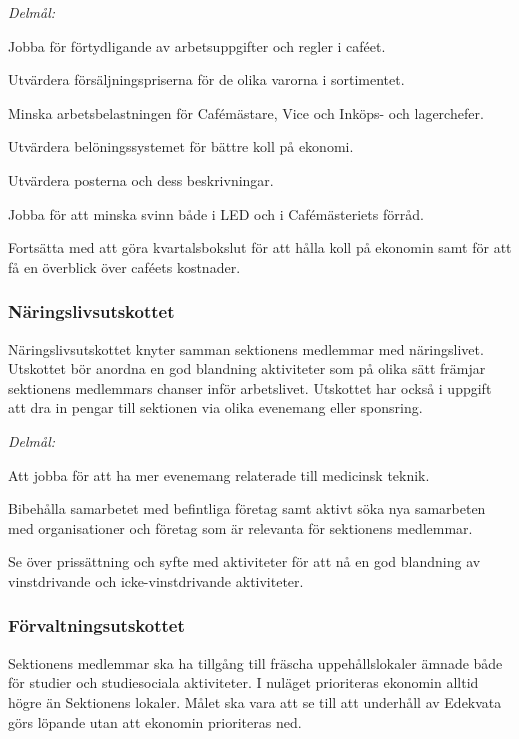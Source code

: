 \documentclass[../_main/handlingar.tex]{subfiles}
\begin{document}
\emph{Delmål:}
\begin{dashlist}
	\item Jobba för förtydligande av arbetsuppgifter och regler i caféet.
	\item Utvärdera försäljningspriserna för de olika varorna i sortimentet.
	\item Minska arbetsbelastningen för Cafémästare, Vice och Inköps- och lagerchefer.
	\item Utvärdera belöningssystemet för bättre koll på ekonomi.
	\item Utvärdera posterna och dess beskrivningar.
	\item Jobba för att minska svinn både i LED och i Cafémästeriets förråd.
	\item Fortsätta med att göra kvartalsbokslut för att hålla koll på ekonomin samt för att få en överblick över caféets kostnader.
\end{dashlist}

\subsubsection*{Näringslivsutskottet}
Näringslivsutskottet knyter samman sektionens medlemmar med näringslivet. Utskottet bör anordna en god blandning aktiviteter som på olika sätt främjar sektionens medlemmars chanser inför arbetslivet. Utskottet har också i uppgift att dra in pengar till sektionen via olika evenemang eller sponsring.

\emph{Delmål:}
\begin{dashlist}
	\item Att jobba för att ha mer evenemang relaterade till medicinsk teknik.
	\item Bibehålla samarbetet med befintliga företag samt aktivt söka nya samarbeten med organisationer och företag som är relevanta för sektionens medlemmar.
	\item Se över prissättning och syfte med aktiviteter för att nå en god blandning av vinstdrivande och icke-vinstdrivande aktiviteter.
\end{dashlist}

\subsubsection*{Förvaltningsutskottet}
Sektionens medlemmar ska ha tillgång till fräscha uppehållslokaler ämnade både för studier och studiesociala aktiviteter. I nuläget prioriteras ekonomin alltid högre än Sektionens lokaler. Målet ska vara att se till att underhåll av Edekvata görs löpande utan att ekonomin prioriteras ned.
\end{document}
